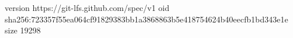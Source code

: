 version https://git-lfs.github.com/spec/v1
oid sha256:723357f55ea064cf91829383bb1a3868863b5e418754624b40eecfb1bd343e1e
size 19298
